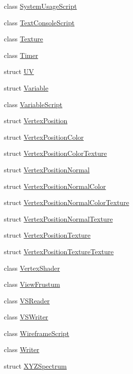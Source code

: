 \begin{DoxyCompactItemize}
class \hyperlink{classmage_1_1_system_usage_script}{System\+Usage\+Script}
\item 
class \hyperlink{classmage_1_1_text_console_script}{Text\+Console\+Script}
\item 
class \hyperlink{classmage_1_1_texture}{Texture}
\item 
class \hyperlink{classmage_1_1_timer}{Timer}
\item 
struct \hyperlink{structmage_1_1_u_v}{UV}
\item 
struct \hyperlink{structmage_1_1_variable}{Variable}
\item 
class \hyperlink{classmage_1_1_variable_script}{Variable\+Script}
\item 
struct \hyperlink{structmage_1_1_vertex_position}{Vertex\+Position}
\item 
struct \hyperlink{structmage_1_1_vertex_position_color}{Vertex\+Position\+Color}
\item 
struct \hyperlink{structmage_1_1_vertex_position_color_texture}{Vertex\+Position\+Color\+Texture}
\item 
struct \hyperlink{structmage_1_1_vertex_position_normal}{Vertex\+Position\+Normal}
\item 
struct \hyperlink{structmage_1_1_vertex_position_normal_color}{Vertex\+Position\+Normal\+Color}
\item 
struct \hyperlink{structmage_1_1_vertex_position_normal_color_texture}{Vertex\+Position\+Normal\+Color\+Texture}
\item 
struct \hyperlink{structmage_1_1_vertex_position_normal_texture}{Vertex\+Position\+Normal\+Texture}
\item 
struct \hyperlink{structmage_1_1_vertex_position_texture}{Vertex\+Position\+Texture}
\item 
struct \hyperlink{structmage_1_1_vertex_position_texture_texture}{Vertex\+Position\+Texture\+Texture}
\item 
class \hyperlink{classmage_1_1_vertex_shader}{Vertex\+Shader}
\item 
class \hyperlink{classmage_1_1_view_frustum}{View\+Frustum}
\item 
class \hyperlink{classmage_1_1_v_s_reader}{V\+S\+Reader}
\item 
class \hyperlink{classmage_1_1_v_s_writer}{V\+S\+Writer}
\item 
class \hyperlink{classmage_1_1_wireframe_script}{Wireframe\+Script}
\item 
class \hyperlink{classmage_1_1_writer}{Writer}
\item 
struct \hyperlink{structmage_1_1_x_y_z_spectrum}{X\+Y\+Z\+Spectrum}
\end{DoxyCompactItemize}
